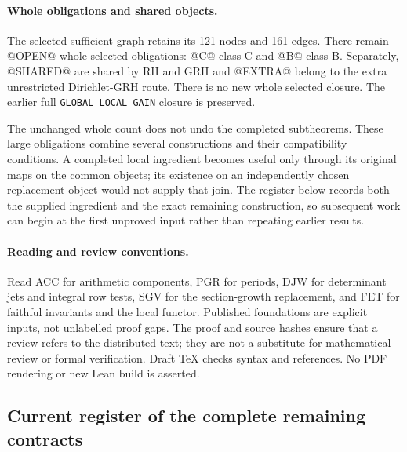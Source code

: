 \paragraph{Whole obligations and shared objects.}
The selected sufficient graph retains its 121 nodes and 161 edges.
There remain @OPEN@ whole selected obligations: @C@ class C and @B@
class B.  Separately, @SHARED@ are shared by RH and GRH and @EXTRA@
belong to the extra unrestricted Dirichlet-GRH route.  There is no new
whole selected closure.  The earlier full
\texttt{GLOBAL\_LOCAL\_GAIN} closure is preserved.

The unchanged whole count does not undo the completed subtheorems.
These large obligations combine several constructions and their
compatibility conditions.  A completed local ingredient becomes useful
only through its original maps on the common objects; its existence on
an independently chosen replacement object would not supply that join.
The register below records both the supplied ingredient and the exact
remaining construction, so subsequent work can begin at the first
unproved input rather than repeating earlier results.

\paragraph{Reading and review conventions.}
Read ACC for arithmetic components, PGR for periods, DJW for determinant
jets and integral row tests, SGV for the section-growth replacement,
and FET for faithful invariants and the local functor.  Published
foundations are explicit inputs, not unlabelled proof gaps.  The proof
and source hashes ensure that a review refers to the distributed text;
they are not a substitute for mathematical review or formal verification.
Draft TeX checks syntax and references.  No PDF rendering or new Lean
build is asserted.

\subsection{Current register of the complete remaining contracts}

